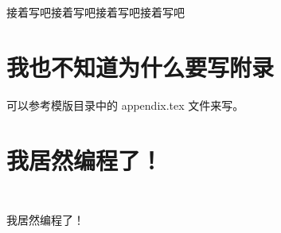 \documentclass{swfcthesis}
\begin{document}
接着写吧接着写吧接着写吧接着写吧


\Appendix{}
\printbibliography[heading={bibintoc},title={参考文献}] %
\advisorinfopage{}                 %
\acknowledgmentspage{}             %


\chapter{我也不知道为什么要写附录} %
\label{app:one}

可以参考模版目录中的 appendix.tex 文件来写。

\chapter{我居然编程了！} %
\label{app:two}

\inputminted[fontsize=\small]{c}{hello.c}

\begin{listing}[H]
  \inputminted{c}{hello.c}
  \caption{我居然编程了！}
  \label{lst:hello}
\end{listing}  

\end{document}
